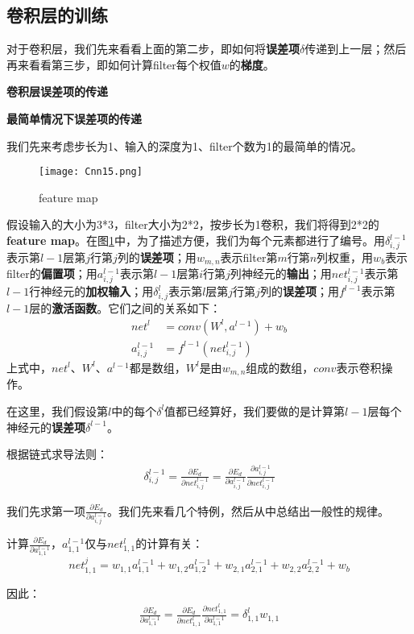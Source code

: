 \subsection{卷积层的训练}\label{Cnn:8}

对于卷积层，我们先来看看上面的第二步，即如何将\textbf{误差项}\(\delta\)传递到上一层；然后再来看看第三步，即如何计算filter每个权值\(w\)的\textbf{梯度}。

\textbf{卷积层误差项的传递}

\textbf{最简单情况下误差项的传递}

我们先来考虑步长为1、输入的深度为1、filter个数为1的最简单的情况。

\begin{figure}[!h]
	\centering
	\texttt{[image: Cnn15.png]}
	\caption{feature map}
	\label{fig:Cnn15}
\end{figure}

假设输入的大小为3*3，filter大小为2*2，按步长为1卷积，我们将得到2*2的\textbf{feature map}。在图\ref{fig:Cnn15}中，为了描述方便，我们为每个元素都进行了编号。用\(\delta^{l-1}_{i,j}\)表示第\(l-1\)层第\(j\)行第\(j\)列的\textbf{误差项}；用\(w_{m,n}\)表示filter第\(m\)行第\(n\)列权重，用\(w_b\)表示filter的\textbf{偏置项}；用\(a^{l-1}_{i,j}\)表示第\(l-1\)层第\(i\)行第\(j\)列神经元的\textbf{输出}；用\(net^{l-1}_{i,j}\)表示第\(l-1\)行神经元的\textbf{加权输入}；用\(\delta^l_{i,j}\)表示第\(l\)层第\(j\)行第\(j\)列的\textbf{误差项}；用\(f^{l-1}\)表示第\(l-1\)层的\textbf{激活函数}。它们之间的关系如下：
\begin{align*}
	net^l         & =conv(W^l, a^{l-1})+w_b   \\
	a^{l-1}_{i,j} & =f^{l-1}(net^{l-1}_{i,j})
\end{align*}
上式中，\(net^l\)、\(W^l\)、\(a^{l-1}\)都是数组，\(W^l\)是由\(w_{m,n}\)组成的数组，\(conv\)表示卷积操作。

在这里，我们假设第\(l\)中的每个\(\delta^l\)值都已经算好，我们要做的是计算第\(l-1\)层每个神经元的\textbf{误差项}\(\delta^{l-1}\)。

根据链式求导法则：
\begin{align*}
	\delta^{l-1}_{i,j}=\frac{\partial{E_d}}{\partial{net^{l-1}_{i,j}}} =\frac{\partial{E_d}}{\partial{a^{l-1}_{i,j}}}\frac{\partial{a^{l-1}_{i,j}}}{\partial{net^{l-1}_{i,j}}}
\end{align*}

我们先求第一项\(\frac{\partial{E_d}}{\partial{a^{l-1}_{i,j}}}\)。我们先来看几个特例，然后从中总结出一般性的规律。

\begin{example}
	计算\(\frac{\partial{E_d}}{\partial{a^{l-1}_{1,1}}}\)，\(a^{l-1}_{1,1}\)仅与\(net^l_{1,1}\)的计算有关：
	\begin{equation*}
		net^j_{1,1}=w_{1,1}a^{l-1}_{1,1}+w_{1,2}a^{l-1}_{1,2}+w_{2,1}a^{l-1}_{2,1}+w_{2,2}a^{l-1}_{2,2}+w_b
	\end{equation*}
\end{example}
因此：
\begin{align*}
	\frac{\partial{E_d}}{\partial{a^{l-1}_{1,1}}}=\frac{\partial{E_d}}{\partial{net^{l}_{1,1}}}\frac{\partial{net^{l}_{1,1}}}{\partial{a^{l-1}_{1,1}}}=\delta^l_{1,1}w_{1,1}
\end{align*}

